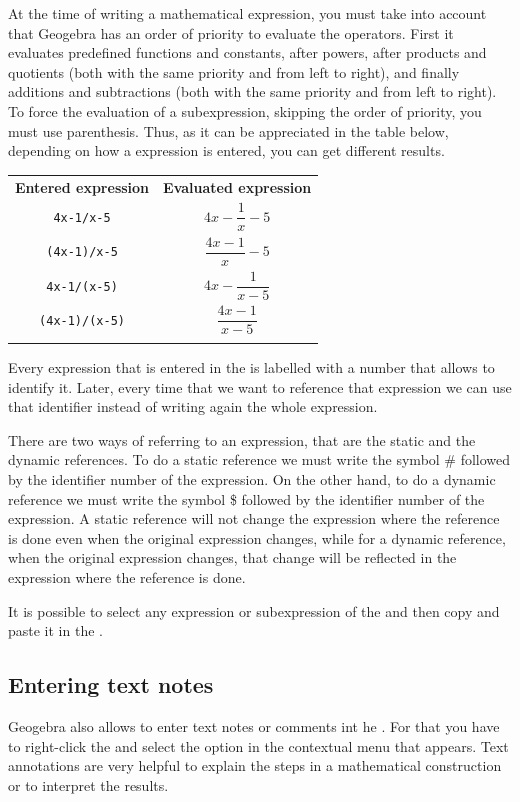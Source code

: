 At the time of writing a mathematical expression, you must take into account that Geogebra has an order of priority to evaluate the operators.
First it evaluates predefined functions and constants, after powers, after products and quotients (both with the same priority and from left to right), and finally additions and subtractions (both with the same priority and from left to right).
To force the evaluation of a subexpression, skipping the order of priority, you must use parenthesis.
Thus, as it can be appreciated in the table below, depending on how a expression is entered, you can get different results.

\begin{center}\renewcommand{\arraystretch}{2}
\begin{tabular}{cc}
\tcrule
\textbf{Entered expression} & \textbf{Evaluated expression} \\
\texttt{4x-1/x-5}           & $4x-\dfrac{1}{x}-5$           \\
\texttt{(4x-1)/x-5}         & $\dfrac{4x-1}{x}-5$           \\
\texttt{4x-1/(x-5)}         & $4x-\dfrac{1}{x-5}$           \\
\texttt{(4x-1)/(x-5)}       & $\dfrac{4x-1}{x-5}$           \\
\bcrule
\end{tabular}
\end{center}

Every expression that is entered in the  is labelled with a number that allows to identify it.
Later, every time that we want to reference that expression we can use that identifier instead of writing again the whole expression.

There are two ways of referring to an expression, that are the static and the dynamic references.
To do a static reference we must write the symbol \# followed by the identifier number of the expression.
On the other hand, to do a dynamic reference we must write the symbol \$ followed by the identifier number of the expression.
A static reference will not change the expression where the reference is done even when the original expression changes, while for a dynamic reference, when the original expression changes, that change will be reflected in the expression where the reference is done.

It is possible to select any expression or subexpression of the  and then copy and paste it in the .


\subsection*{Entering text notes}
Geogebra also allows to enter text notes or comments int he .
For that you have to right-click the  and select the option  in the contextual menu that appears.
Text annotations are very helpful to explain the steps in a mathematical construction or to interpret the results.


